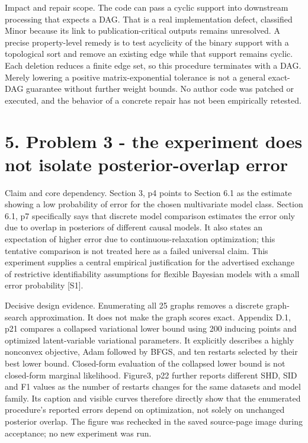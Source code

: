 \documentclass[10pt]{article}
\begin{document}
Impact and repair scope. The code can pass a cyclic support into downstream processing that expects a DAG. That is a real implementation defect, classified Minor because its link to publication-critical outputs remains unresolved. A precise property-level remedy is to test acyclicity of the binary support with a topological sort and remove an existing edge while that support remains cyclic. Each deletion reduces a finite edge set, so this procedure terminates with a DAG. Merely lowering a positive matrix-exponential tolerance is not a general exact-DAG guarantee without further weight bounds. No author code was patched or executed, and the behavior of a concrete repair has not been empirically retested.\par
\section*{5. Problem 3 - the experiment does not isolate posterior-overlap error}
Claim and core dependency. Section 3, p4 points to Section 6.1 as the estimate showing a low probability of error for the chosen multivariate model class. Section 6.1, p7 specifically says that discrete model comparison estimates the error only due to overlap in posteriors of different causal models. It also states an expectation of higher error due to continuous-relaxation optimization; this tentative comparison is not treated here as a failed universal claim. This experiment supplies a central empirical justification for the advertised exchange of restrictive identifiability assumptions for flexible Bayesian models with a small error probability [S1].\par
Decisive design evidence. Enumerating all 25 graphs removes a discrete graph-search approximation. It does not make the graph scores exact. Appendix D.1, p21 compares a collapsed variational lower bound using 200 inducing points and optimized latent-variable variational parameters. It explicitly describes a highly nonconvex objective, Adam followed by BFGS, and ten restarts selected by their best lower bound. Closed-form evaluation of the collapsed lower bound is not closed-form marginal likelihood. Figure3, p22 further reports different SHD, SID and F1 values as the number of restarts changes for the same datasets and model family. Its caption and visible curves therefore directly show that the enumerated procedure’s reported errors depend on optimization, not solely on unchanged posterior overlap. The figure was rechecked in the saved source-page image during acceptance; no new experiment was run.\par
\end{document}
